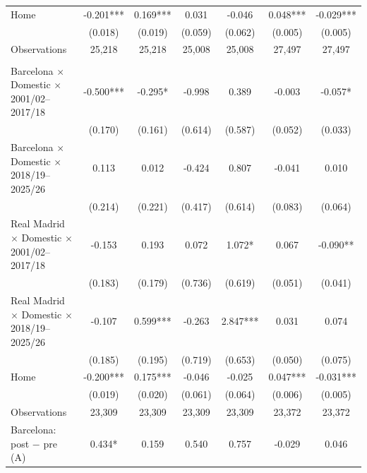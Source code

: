 \begin{table}[!h]
{\begin{threeparttable}
\begin{tabular}[t]{lcccccc}
\hspace{1em}Home & -0.201*** & 0.169*** & 0.031 & -0.046 & 0.048*** & -0.029***\\
\hspace{1em} & (0.018) & (0.019) & (0.059) & (0.062) & (0.005) & (0.005)\\
\hspace{1em}Observations & 25,218 & 25,218 & 25,008 & 25,008 & 27,497 & 27,497\\
\addlinespace[0.5em]
\multicolumn{7}{l}{\textit{Panel B: Adding possession-bin fixed effects}}\\
\midrule \hspace{1em}Barcelona $\times$ Domestic $\times$ 2001/02--2017/18 & -0.500*** & -0.295* & -0.998 & 0.389 & -0.003 & -0.057*\\
\hspace{1em} & (0.170) & (0.161) & (0.614) & (0.587) & (0.052) & (0.033)\\
\hspace{1em}Barcelona $\times$ Domestic $\times$ 2018/19--2025/26 & 0.113 & 0.012 & -0.424 & 0.807 & -0.041 & 0.010\\
\hspace{1em} & (0.214) & (0.221) & (0.417) & (0.614) & (0.083) & (0.064)\\
\hspace{1em}Real Madrid $\times$ Domestic $\times$ 2001/02--2017/18 & -0.153 & 0.193 & 0.072 & 1.072* & 0.067 & -0.090**\\
\hspace{1em} & (0.183) & (0.179) & (0.736) & (0.619) & (0.051) & (0.041)\\
\hspace{1em}Real Madrid $\times$ Domestic $\times$ 2018/19--2025/26 & -0.107 & 0.599*** & -0.263 & 2.847*** & 0.031 & 0.074\\
\hspace{1em} & (0.185) & (0.195) & (0.719) & (0.653) & (0.050) & (0.075)\\
\hspace{1em}Home & -0.200*** & 0.175*** & -0.046 & -0.025 & 0.047*** & -0.031***\\
\hspace{1em} & (0.019) & (0.020) & (0.061) & (0.064) & (0.006) & (0.005)\\
\hspace{1em}Observations & 23,309 & 23,309 & 23,309 & 23,309 & 23,372 & 23,372\\
Barcelona: post $-$ pre (A) & 0.434* & 0.159 & 0.540 & 0.757 & -0.029 & 0.046\\

\end{tabular}
\end{threeparttable}}
\end{table}
